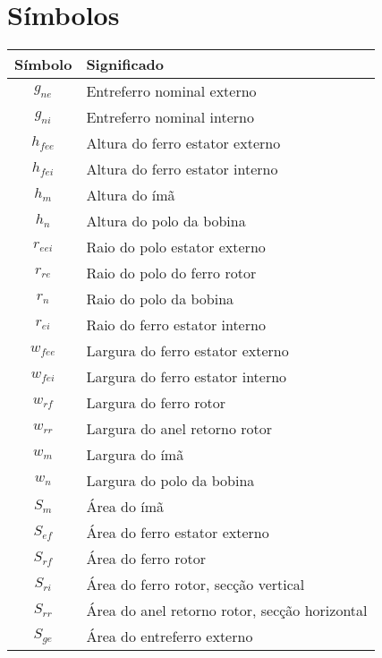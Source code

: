 \chapter*{Símbolos}
\fancyhead{}
\fancyhead[LO,RE]{\thepage}
\fancyfoot{}
\renewcommand{\headrulewidth}{0pt}
\renewcommand{\footrulewidth}{0pt}
\headheight 13.6pt


\begin{longtable}{c l}
Símbolo &  Significado \\ 
\hline \hline

	$g_{ne}$	& Entreferro nominal externo \\
	$g_{ni}$	& Entreferro nominal interno \\

	$h_{fee}$	& Altura do ferro estator externo \\
	$h_{fei}$	& Altura do ferro estator interno \\
	$h_m$		& Altura do ímã \\
	$h_n$		& Altura do polo da bobina \\
	
	$r_{eei}$	& Raio do polo estator externo \\				
	$r_{re}$	& Raio do polo do ferro rotor \\		
	$r_{n}$		& Raio do polo da bobina \\		
	$r_{ei}$	& Raio do ferro estator interno \\	

	$w_{fee}$	& Largura do ferro estator externo\\
	$w_{fei}$	& Largura do ferro estator interno \\
	$w_{rf}$	& Largura do ferro rotor \\
	$w_{rr}$	& Largura do anel retorno rotor \\
	$w_m$		& Largura do ímã \\
	$w_n$		& Largura do polo da bobina \\

	$S_m$		& Área do ímã\\	
	$S_{ef}$	& Área do ferro estator externo \\
	$S_{rf}$	& Área do ferro rotor\\
	$S_{ri}$	& Área do ferro rotor, secção vertical \\
	$S_{rr}$	& Área do anel retorno rotor, secção horizontal\\
	$S_{ge}$	& Área do entreferro externo\\


\end{longtable}
